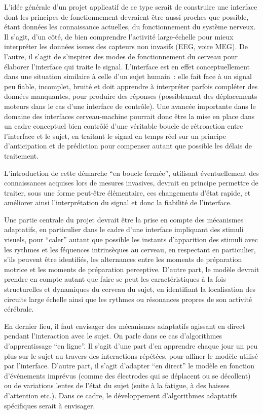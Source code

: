 \documentclass[11pt]{article}
\begin{document}
L'idée générale d'un projet applicatif de ce type serait de construire une interface
dont les principes de fonctionnement devraient être aussi proches que possible, étant données
les connaissance actuelles, du fonctionnement du système nerveux.
Il s'agit, d'un côté, de bien comprendre l'activité large-échelle pour mieux
interpréter les données issues des capteurs non invasifs (EEG, voire MEG).
De l'autre, il s'agit de s'inspirer des modes de fonctionnement du cerveau
pour élaborer l'interface qui traite le signal. L'interface est en effet conceptuellement
dans une situation similaire à celle d'un sujet humain~: elle fait face à un signal peu fiable,
incomplet, bruité et doit apprendre à interpréter parfois compléter des données manquantes,
pour produire des réponses (possiblement des déplacements moteurs dans le cas d'une interface de
contrôle). Une avancée importante dans le domaine des interfaces cerveau-machine
pourrait donc être la mise en place dans un cadre conceptuel bien contrôlé d'une véritable
boucle de rétroaction entre l'interface et le sujet, en traitant le signal en temps réel 
sur un principe d'anticipation et de prédiction pour compenser autant que possible les délais
de traitement. 

L'introduction de cette démarche ``en boucle fermée'', utilisant éventuellement des connaissances
acquises lors de mesures invasives, devrait en principe permettre de traiter, sous une forme peut-être élémentaire,
ces changements d'état rapide, et  améliorer ainsi l'interprétation 
du signal et donc la fiabilité de l'interface.

Une partie centrale du projet devrait être la prise en compte des mécanismes adaptatifs,
en particulier dans le cadre d'une interface impliquant des stimuli visuels, pour ``caler''
autant que possible les instants d'apparition des stimuli avec les rythmes et les féquences intrinsèques
au cerveau, en respectant en particulier, s'ils peuvent être identifiés, les alternances
entre les moments de préparation motrice et les moments de préparation perceptive. 
D'autre part, le modèle devrait prendre en compte autant que faire se peut les caractéristiques
à la fois structurelles et dynamiques du cerveau du sujet, en identifiant la localisation des
circuits large échelle ainsi que les rythmes ou résonances propres de son activité cérébrale.

En dernier lieu, il faut envisager des mécanismes adaptatifs agissant en direct pendant 
l'interaction avec le sujet. On parle dans ce cas d'algorithmes d'apprentissage ``en ligne''. 
Il s'agit d'une part d'en apprendre chaque jour un peu plus sur le sujet au travers des interactions répétées,
pour affiner le modèle utilisé par l'interface. 
D'autre part, il s'agit d'adapter ``en direct'' le modèle en fonction d'événements imprévus (comme
des électrodes qui se déplacent ou se décollent) 
ou de variations lentes de l'état du sujet (suite à la fatigue, à des baisses d'attention etc.).
Dans ce cadre, le développement d'algorithmes adaptatifs spécifiques serait à
envisager. 
\end{document}
